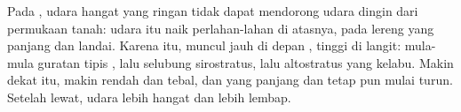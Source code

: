 Pada , udara hangat yang ringan tidak dapat mendorong udara
dingin dari permukaan tanah: udara itu naik perlahan-lahan di atasnya,
pada lereng yang panjang dan landai. Karena itu,  muncul jauh di
depan , tinggi di langit: mula-mula guratan tipis  , lalu
selubung sirostratus, lalu altostratus yang kelabu. Makin dekat  itu,
 makin rendah dan tebal, dan  yang panjang dan tetap pun mulai
turun. Setelah  lewat, udara lebih hangat dan lebih lembap.

